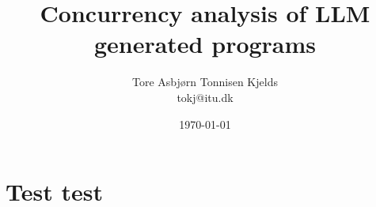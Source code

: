 \documentclass[12pt,a4paper]{report}
\title{Concurrency analysis of LLM generated programs}
\author{Tore Asbjørn Tonnisen Kjelds \\ tokj@itu.dk}
\date{\today}
\begin{document}
\maketitle



\section{
 Test test 
 }

\printbibliography
\end{document}
